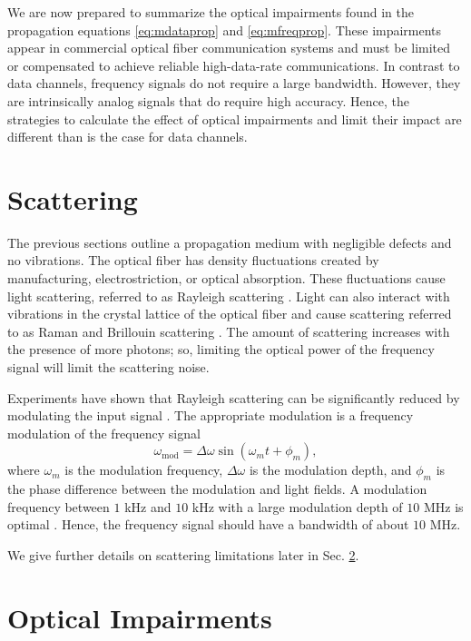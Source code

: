 We are now prepared to summarize the optical impairments found in the propagation equations \ref{eq:mdataprop} and \ref{eq:mfreqprop}. These impairments appear in commercial optical fiber communication systems and must be limited or compensated to achieve reliable high-data-rate communications. In contrast to data channels, frequency signals do not require a large bandwidth. However, they are intrinsically analog signals that do require high accuracy. Hence, the strategies to calculate the effect of optical impairments and limit their impact are different than is the case for data channels.

\section{Scattering} \label{sec:scattering}

The previous sections outline a propagation medium with negligible defects and no vibrations. The optical fiber has density fluctuations created by manufacturing, electrostriction, or optical absorption. These fluctuations cause light scattering, referred to as Rayleigh scattering \cite{Boyd2003}. Light can also interact with vibrations in the crystal lattice of the optical fiber and cause scattering referred to as Raman and Brillouin scattering \cite{Boyd2003}. The amount of scattering increases with the presence of more photons; so, limiting the optical power of the frequency signal will limit the scattering noise.

Experiments have shown that Rayleigh scattering can be significantly reduced by modulating the input signal \cite{Okusaga:13}. The appropriate modulation is a frequency modulation of the frequency signal
%
\begin{equation}
	\label{eq:modulation}
	\omega_{\text{mod}} = \Delta\omega\sin(\omega_mt + \phi_m),
\end{equation}
%
where $\omega_m$ is the modulation frequency, $\Delta\omega$ is the modulation depth, and $\phi_m$ is the phase difference between the modulation and light fields\cite{menyukIFCS2015}. A modulation frequency between $1$ kHz and $10$ kHz with a large modulation depth of $10$ MHz is optimal \cite{menyukIFCS2015}. Hence, the frequency signal should have a bandwidth of about $10$ MHz.

We give further details on scattering limitations later in Sec. \ref{sec:impair}.

\section{Optical Impairments} \label{sec:impair}

